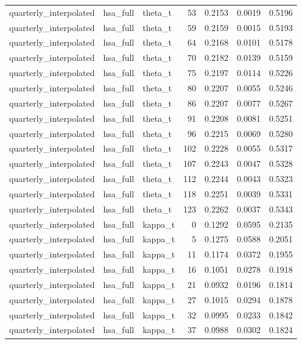 \begin{tabular}{lllrrrr}
quarterly\_interpolated & hsa\_full & theta\_t & 53 & 0.2153 & 0.0019 & 0.5196 \\
quarterly\_interpolated & hsa\_full & theta\_t & 59 & 0.2159 & 0.0015 & 0.5193 \\
quarterly\_interpolated & hsa\_full & theta\_t & 64 & 0.2168 & 0.0101 & 0.5178 \\
quarterly\_interpolated & hsa\_full & theta\_t & 70 & 0.2182 & 0.0139 & 0.5159 \\
quarterly\_interpolated & hsa\_full & theta\_t & 75 & 0.2197 & 0.0114 & 0.5226 \\
quarterly\_interpolated & hsa\_full & theta\_t & 80 & 0.2207 & 0.0055 & 0.5246 \\
quarterly\_interpolated & hsa\_full & theta\_t & 86 & 0.2207 & 0.0077 & 0.5267 \\
quarterly\_interpolated & hsa\_full & theta\_t & 91 & 0.2208 & 0.0081 & 0.5251 \\
quarterly\_interpolated & hsa\_full & theta\_t & 96 & 0.2215 & 0.0069 & 0.5280 \\
quarterly\_interpolated & hsa\_full & theta\_t & 102 & 0.2228 & 0.0055 & 0.5317 \\
quarterly\_interpolated & hsa\_full & theta\_t & 107 & 0.2243 & 0.0047 & 0.5328 \\
quarterly\_interpolated & hsa\_full & theta\_t & 112 & 0.2244 & 0.0043 & 0.5323 \\
quarterly\_interpolated & hsa\_full & theta\_t & 118 & 0.2251 & 0.0039 & 0.5331 \\
quarterly\_interpolated & hsa\_full & theta\_t & 123 & 0.2262 & 0.0037 & 0.5343 \\
quarterly\_interpolated & hsa\_full & kappa\_t & 0 & 0.1292 & 0.0595 & 0.2135 \\
quarterly\_interpolated & hsa\_full & kappa\_t & 5 & 0.1275 & 0.0588 & 0.2051 \\
quarterly\_interpolated & hsa\_full & kappa\_t & 11 & 0.1174 & 0.0372 & 0.1955 \\
quarterly\_interpolated & hsa\_full & kappa\_t & 16 & 0.1051 & 0.0278 & 0.1918 \\
quarterly\_interpolated & hsa\_full & kappa\_t & 21 & 0.0932 & 0.0196 & 0.1814 \\
quarterly\_interpolated & hsa\_full & kappa\_t & 27 & 0.1015 & 0.0294 & 0.1878 \\
quarterly\_interpolated & hsa\_full & kappa\_t & 32 & 0.0995 & 0.0233 & 0.1842 \\
quarterly\_interpolated & hsa\_full & kappa\_t & 37 & 0.0988 & 0.0302 & 0.1824 \\

\end{tabular}
